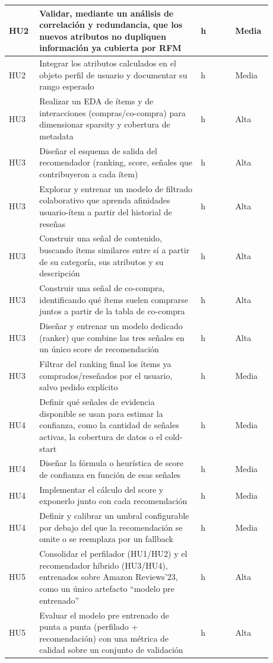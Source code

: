 \documentclass[
11pt, %
]{charter}
\begin{document}
\begin{longtable}{|>{\raggedright\arraybackslash}p{0.10\linewidth}|>{\raggedright\arraybackslash}p{0.56\linewidth}|>{\centering\arraybackslash}p{0.12\linewidth}|>{\centering\arraybackslash}p{0.10\linewidth}|}
HU2 & Validar, mediante un análisis de correlación y redundancia, que los nuevos atributos no dupliquen información ya cubierta por RFM & 3 h & Media \\ \hline
HU2 & Integrar los atributos calculados en el objeto perfil de usuario y documentar su rango esperado & 3 h & Media \\ \hline
HU3 & Realizar un EDA de ítems y de interacciones (compras/co-compra) para dimensionar sparsity y cobertura de metadata & 4 h & Alta \\ \hline
HU3 & Diseñar el esquema de salida del recomendador (ranking, score, señales que contribuyeron a cada ítem) & 3 h & Alta \\ \hline
HU3 & Explorar y entrenar un modelo de filtrado colaborativo que aprenda afinidades usuario-ítem a partir del historial de reseñas & 8 h & Alta \\ \hline
HU3 & Construir una señal de contenido, buscando ítems similares entre sí a partir de su categoría, sus atributos y su descripción & 8 h & Alta \\ \hline
HU3 & Construir una señal de co-compra, identificando qué ítems suelen comprarse juntos a partir de la tabla de co-compra & 6 h & Alta \\ \hline
HU3 & Diseñar y entrenar un modelo dedicado (ranker) que combine las tres señales en un único score de recomendación & 8 h & Alta \\ \hline
HU3 & Filtrar del ranking final los ítems ya comprados/reseñados por el usuario, salvo pedido explícito & 2 h & Media \\ \hline
HU4 & Definir qué señales de evidencia disponible se usan para estimar la confianza, como la cantidad de señales activas, la cobertura de datos o el cold-start & 3 h & Media \\ \hline
HU4 & Diseñar la fórmula o heurística de score de confianza en función de esas señales & 3 h & Media \\ \hline
HU4 & Implementar el cálculo del score y exponerlo junto con cada recomendación & 3 h & Media \\ \hline
HU4 & Definir y calibrar un umbral configurable por debajo del que la recomendación se omite o se reemplaza por un fallback & 4 h & Media \\ \hline
HU5 & Consolidar el perfilador (HU1/HU2) y el recomendador híbrido (HU3/HU4), entrenados sobre Amazon Reviews'23, como un único artefacto ``modelo pre entrenado'' & 4 h & Alta \\ \hline
HU5 & Evaluar el modelo pre entrenado de punta a punta (perfilado + recomendación) con una métrica de calidad sobre un conjunto de validación & 5 h & Alta \\ \hline

\end{longtable}
\end{document}
